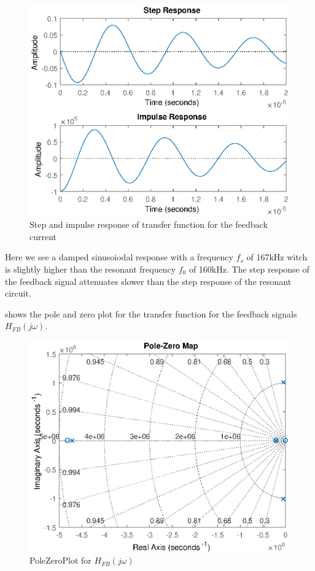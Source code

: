 \begin{figure}[H]
    \centering
    \includegraphics[width=\textwidth]{img/FeedBackResponse.eps}
    \caption{Step and impulse response of transfer function for the feedback current}
    \label{fig:fb_step}
\end{figure}

Here we see a damped sinusoiodal response with a frequency $f_s$ of 167kHz witch is slightly higher than the resonant frequency $f_0$ of 160kHz. The step response of the feedback signal attenuates slower than the step response of the resonant circuit.

 shows the pole and zero plot for the transfer function for the feedback signals $H_{FB}(j\omega)$.

\begin{figure}[H]
    \centering
    \includegraphics[width=\textwidth]{img/FeedBackPoleZeroPlot.eps}
    \caption{PoleZeroPlot for $H_{FB}(j\omega)$}
    \label{fig:fbpolezero}
\end{figure}

